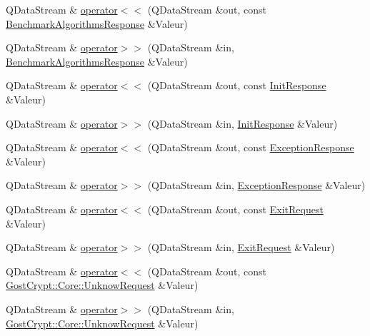 \begin{DoxyCompactItemize}
Q\+Data\+Stream \& \hyperlink{namespace_gost_crypt_1_1_core_af2eff56a99d6d4fd0ee989c8b5d544f5}{operator$<$$<$} (Q\+Data\+Stream \&out, const \hyperlink{struct_gost_crypt_1_1_core_1_1_benchmark_algorithms_response}{Benchmark\+Algorithms\+Response} \&Valeur)
\item 
Q\+Data\+Stream \& \hyperlink{namespace_gost_crypt_1_1_core_a9ba39e6dd3edd665d9cc31cf8c93b32d}{operator$>$$>$} (Q\+Data\+Stream \&in, \hyperlink{struct_gost_crypt_1_1_core_1_1_benchmark_algorithms_response}{Benchmark\+Algorithms\+Response} \&Valeur)
\item 
Q\+Data\+Stream \& \hyperlink{namespace_gost_crypt_1_1_core_afa803936f88459cb0037133936fae1db}{operator$<$$<$} (Q\+Data\+Stream \&out, const \hyperlink{struct_gost_crypt_1_1_core_1_1_init_response}{Init\+Response} \&Valeur)
\item 
Q\+Data\+Stream \& \hyperlink{namespace_gost_crypt_1_1_core_a9b6ac650aa7438569a2c03b9202c14c6}{operator$>$$>$} (Q\+Data\+Stream \&in, \hyperlink{struct_gost_crypt_1_1_core_1_1_init_response}{Init\+Response} \&Valeur)
\item 
Q\+Data\+Stream \& \hyperlink{namespace_gost_crypt_1_1_core_ac48b27037ce0618b76cdc05d85840819}{operator$<$$<$} (Q\+Data\+Stream \&out, const \hyperlink{struct_gost_crypt_1_1_core_1_1_exception_response}{Exception\+Response} \&Valeur)
\item 
Q\+Data\+Stream \& \hyperlink{namespace_gost_crypt_1_1_core_aa650a723ad65de7117bacb1f06e9a1a0}{operator$>$$>$} (Q\+Data\+Stream \&in, \hyperlink{struct_gost_crypt_1_1_core_1_1_exception_response}{Exception\+Response} \&Valeur)
\item 
Q\+Data\+Stream \& \hyperlink{namespace_gost_crypt_1_1_core_a64f3dabf952016ead51ad109863e438e}{operator$<$$<$} (Q\+Data\+Stream \&out, const \hyperlink{struct_gost_crypt_1_1_core_1_1_exit_request}{Exit\+Request} \&Valeur)
\item 
Q\+Data\+Stream \& \hyperlink{namespace_gost_crypt_1_1_core_ab1ef65c46ef7494fa5fa1b80f5b9ea9c}{operator$>$$>$} (Q\+Data\+Stream \&in, \hyperlink{struct_gost_crypt_1_1_core_1_1_exit_request}{Exit\+Request} \&Valeur)
\item 
Q\+Data\+Stream \& \hyperlink{namespace_gost_crypt_1_1_core_a227fb49df0127608b27dda9d27c37d93}{operator$<$$<$} (Q\+Data\+Stream \&out, const \hyperlink{class_gost_crypt_1_1_core_1_1_unknow_request}{Gost\+Crypt\+::\+Core\+::\+Unknow\+Request} \&Valeur)
\item 
Q\+Data\+Stream \& \hyperlink{namespace_gost_crypt_1_1_core_a1a57c7227e93a423e54a737e816aaaab}{operator$>$$>$} (Q\+Data\+Stream \&in, \hyperlink{class_gost_crypt_1_1_core_1_1_unknow_request}{Gost\+Crypt\+::\+Core\+::\+Unknow\+Request} \&Valeur)

\end{DoxyCompactItemize}
